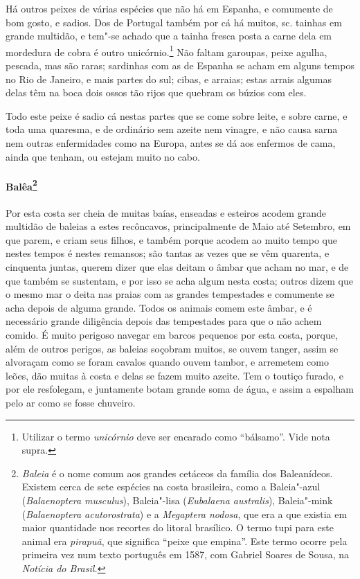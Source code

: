  Há outros peixes de várias espécies que não há em Espanha, e comumente
de bom gosto, e sadios. Dos de Portugal também por cá há muitos, sc.
tainhas em grande multidão, e tem"-se achado que a tainha fresca posta a
carne dela em mordedura de cobra é outro unicórnio.\footnote{ Utilizar 
o termo \textit{unicórnio} deve ser encarado como
``bálsamo''. Vide nota supra.} Não faltam garoupas, peixe agulha,
pescada, mas são raras; sardinhas com as de Espanha se acham em alguns
tempos no Rio de Janeiro, e mais partes do sul; cibas, e arraias; estas
arrais algumas delas têm na boca dois ossos tão rijos que quebram os búzios com eles. 

 Todo este peixe é sadio cá nestas partes que se come sobre leite, e
sobre carne, e toda uma quaresma, e de ordinário sem azeite nem
vinagre, e não causa sarna nem outras enfermidades como na Europa,
antes se dá aos enfermos de cama, ainda que tenham, ou estejam muito no cabo.

\paragraph{Balêa\footnote{ \textit{Baleia} é o nome comum aos grandes
cetáceos da família dos Baleanídeos. Existem cerca de sete espécies na
costa brasileira, como a Baleia"-azul (\textit{Balaenoptera musculus}), 
Baleia"-lisa (\textit{Eubalaena australis}), Baleia"-mink 
(\textit{Balaenoptera acutorostrata}) e a \textit{Megaptera nodosa}, 
que era a que existia em maior quantidade nos recortes do litoral
brasílico. O termo tupi para este animal era \textit{pirapuã}, que
significa ``peixe que empina''. Este termo ocorre pela primeira vez num
texto português em 1587, com Gabriel Soares de Sousa, na
\textit{Notícia do Brasil.}}} Por esta costa ser cheia de
muitas baías, enseadas e esteiros acodem grande multidão de baleias a
estes recôncavos, principalmente de Maio até Setembro, em que parem, e
criam seus filhos, e também porque acodem ao muito tempo que nestes
tempos é nestes remansos; são tantas as vezes que se vêm quarenta, e
cinquenta juntas, querem dizer que elas deitam o âmbar que acham no
mar, e de que também se sustentam, e por isso se acha algum nesta
costa; outros dizem que o mesmo mar o deita nas praias com as grandes
tempestades e comumente se acha depois de alguma grande. Todos os
animais comem este âmbar, e é necessário grande diligência depois das
tempestades para que o não achem comido. É muito perigoso navegar em
barcos pequenos por esta costa, porque, além de outros perigos, as
baleias soçobram muitos, se ouvem tanger, assim se alvoraçam como se
foram cavalos quando ouvem tambor, e arremetem como leões, dão muitas à
costa e delas se fazem muito azeite. Tem o toutiço furado, e por ele
resfolegam, e juntamente botam grande soma de água, e assim a espalham
pelo ar como se fosse chuveiro.

